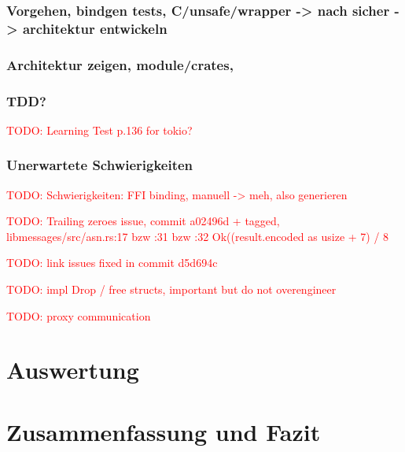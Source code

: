 \documentclass[
	12pt,
	table,
	bigheadings,
	ngerman,
	a4paper,
	BCOR5mm,
	DIV14,
	1.1headlines,
	pagesize,
	oneside,
	openright,
	titlepage,
	headsepline,
	nochapterprefix,
	bibtotoc,
	tocindent,
	listsindent,
	pointlessnumbers,
	cleardoubleempty,
	fleqn,
	halfparskip
]{scrbook}
\newcommand{\todo}[1]{\textcolor{red}{TODO: #1}}
\begin{document}
		\subsection{Vorgehen, bindgen tests, C/unsafe/wrapper -> nach sicher ->  architektur entwickeln}
		
		\subsection{Architektur zeigen, module/crates, }
	
		\subsection{TDD?}
		\todo{Learning Test p.136 for tokio?}
		\subsection{Unerwartete Schwierigkeiten}
		\label{impl:issue:ffi}
		\todo{Schwierigkeiten: FFI binding, manuell -> meh, also generieren}
			
		\todo{Trailing zeroes issue, commit a02496d + tagged, libmessages/src/asn.rs:17 bzw :31 bzw :32 Ok((result.encoded as usize + 7) / 8}
		
		\todo{link issues fixed in commit d5d694c}
		
		\todo{impl Drop / free structs, important but do not overengineer}
		
		\todo{proxy communication}
			
			
	\chapter{Auswertung}
	
	\chapter{Zusammenfassung und Fazit}
	
	
	
	
	\clearpage
	\normalem
	\printbibliography
	
	\clearpage
	\printglossary[type=\acronymtype]

	\clearpage
	\listoffigures
	\lstlistoflistings
	
	
\end{document}
